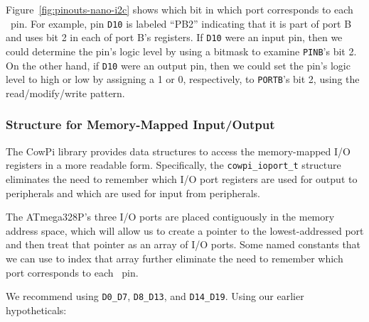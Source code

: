 Figure~\ref{fig:pinouts-nano-i2c} %
shows which bit in which port corresponds to each \mcuboard\ pin.
For example, pin \texttt{D10} is labeled ``PB2'' indicating that it is part of port B and uses bit 2 in each of port B's registers.
If \texttt{D10} were an input pin, then we could determine the pin's logic level by using a bitmask to examine \texttt{PINB}'s bit 2.
On the other hand, if \texttt{D10} were an output pin, then we could set the pin's logic level to high or low by assigning a 1 or 0, respectively, to \texttt{PORTB}'s bit 2, using the read/modify/write pattern.

\subsubsection{Structure for Memory-Mapped Input/Output}

The CowPi library provides data structures to access the memory-mapped I/O registers in a more readable form.
Specifically, the \lstinline{cowpi_ioport_t} structure eliminates the need to remember which I/O port registers are used for output to peripherals and which are used for input from peripherals.



The ATmega328P's three I/O ports are placed contiguously in the memory address space, which will allow us to create a pointer to the lowest-addressed port and then treat that pointer as an array of I/O ports.
Some named constants that we can use to index that array further eliminate the need to remember which port corresponds to each \mcuboard\ pin.



We recommend using \lstinline{D0_D7}, \lstinline{D8_D13}, and \lstinline{D14_D19}.
Using our earlier hypotheticals:

